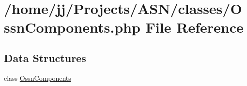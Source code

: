 \hypertarget{_ossn_components_8php}{}\section{/home/jj/\+Projects/\+A\+S\+N/classes/\+Ossn\+Components.php File Reference}
\label{_ossn_components_8php}
\subsection*{Data Structures}
\begin{DoxyCompactItemize}
\item 
class \hyperlink{class_ossn_components}{Ossn\+Components}
\end{DoxyCompactItemize}
